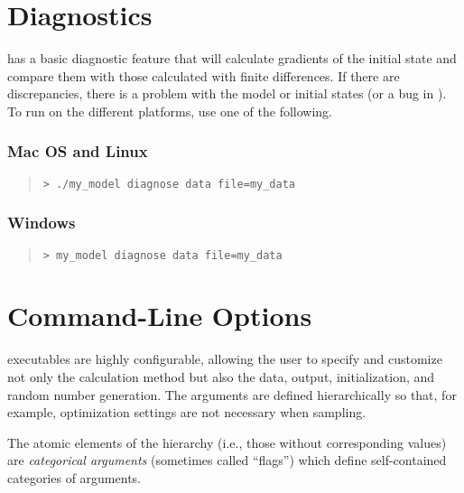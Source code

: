\section{Diagnostics}\label{diagnostics.section}

\CmdStan has a basic diagnostic feature that will calculate gradients of
the initial state and compare them with those calculated with finite
differences.  If there are discrepancies, there is a problem with the
model or initial states (or a bug in \Stan).  To run on the different
platforms, use one of the following.

\subsubsection{Mac OS and Linux}
%
\begin{quote}
\begin{Verbatim}[fontshape=sl]
> ./my_model diagnose data file=my_data
\end{Verbatim}
\end{quote}

\subsubsection{Windows}
%
\begin{quote}
\begin{Verbatim}[fontshape=sl]
> my_model diagnose data file=my_data
\end{Verbatim}
\end{quote}




\section{Command-Line Options}\label{stan-command-line-options.section}

\CmdStan executables are highly configurable, allowing the user to specify
and customize not only the calculation method but also the data, output,
initialization, and random number generation.  The arguments are defined
hierarchically so that, for example, optimization settings are not necessary
when sampling.

The atomic elements of the hierarchy (i.e., those without
corresponding values) are \textit{categorical arguments} (sometimes
called ``flags'') which define self-contained categories of arguments.

